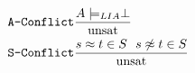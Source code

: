 \begin{figure}
\begin{align*}
 \texttt{A-Conflict} &\frac{ A \models_{LIA} \perp }{ \textnormal{unsat}}\\  
 \texttt{S-Conflict} &\frac{ s\approx t \in S \ \ s \not\approx t \in S}{\textnormal{unsat}}
\end{align*}
\end{figure}